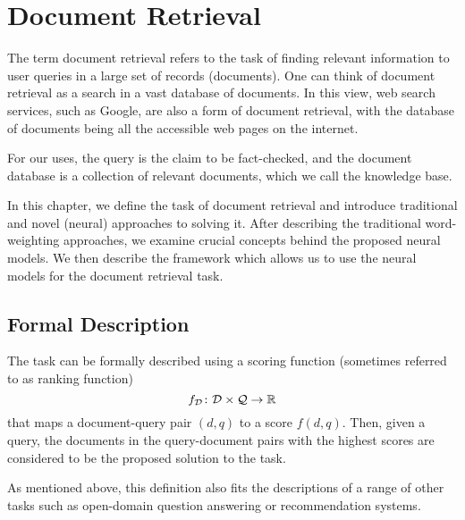 \chapter{Document Retrieval}
\label{chap:docret}

The term document retrieval refers to the task of finding relevant information to user queries in a large set of records (documents). 
One can think of document retrieval as a search in a vast database of documents. 
In this view, web search services, such as Google, are also a form of document retrieval, with the database of documents being all the accessible web pages on the internet.

For our uses, the query is the claim to be fact-checked, and the document database is a collection of relevant documents, which we call the knowledge base. 

In this chapter, we define the task of document retrieval and introduce traditional and novel (neural) approaches to solving it.
After describing the traditional word-weighting approaches, we examine crucial concepts behind the proposed neural models.
We then describe the framework which allows us to use the neural models for the document retrieval task.

\section{Formal Description}
\label{sec:formal_descr_dr}
The task can be formally described \citep{two-tower} using a scoring function (sometimes referred to as ranking function) %
\begin{equation}
        f_\mathcal{D}\colon\mathcal{D}\times\mathcal{Q}\rightarrow\mathbb{R}
        \label{eq:formal_descr_dr}
\end{equation}
that maps a document-query pair $(d, q)$ to a score $f(d,q)$. 
Then, given a query, the documents in the query-document pairs with the highest scores are considered to be the proposed solution to the task. 

As mentioned above, this definition also fits the descriptions of a range of other tasks such as open-domain question answering \citep{wiki-retrieval} or recommendation systems.

